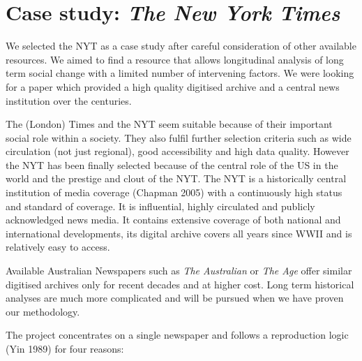 
\section{Case study: \emph{The New York Times}}

We selected the NYT as a case study after careful consideration of other available resources. We aimed to find a resource that allows longitudinal analysis of long term social change with a limited number of intervening factors. We were looking for a paper which provided a high quality digitised archive and a central news institution over the centuries. 

The (London) Times and the NYT seem suitable because of their important social role within a society. They also fulfil further selection criteria such as wide circulation (not just regional), good accessibility and high data quality. However the NYT has been finally selected because of the central role of the US in the world and the prestige and clout of the NYT. The NYT is a historically central institution of media coverage (Chapman 2005) with a continuously high status and standard of coverage. It is influential, highly circulated and publicly acknowledged news media. It contains extensive coverage of both national and international developments, its digital archive covers all years since WWII and is relatively easy to access.

Available Australian Newspapers such as \emph{The Australian} or \emph{The Age} offer similar digitised archives only for recent decades and at higher cost. Long term historical analyses are much more complicated and will be pursued when we have proven our methodology.


The project concentrates on a single newspaper and follows a reproduction logic (Yin 1989) for four reasons: 

